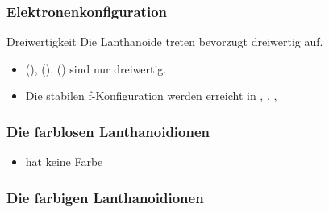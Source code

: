 \documentclass{beamer}
\begin{document}
\begin{frame}[t]\frametitle{Elektronenkonfiguration}

\begin{beamerboxesrounded}[shadow=true]{Dreiwertigkeit}
  Die Lanthanoide treten bevorzugt dreiwertig auf.
\end{beamerboxesrounded}
     \begin{table}
      \centering
{}
\end{table}

    \begin{itemize}
      \item {} (),  (),  () sind nur dreiwertig.
      \item Die stabilen f-Konfiguration werden erreicht in , , ,
    \end{itemize}
\end{frame}



  \begin{frame}[t]\frametitle{ Die farblosen Lanthanoidionen }
  \begin{beamerboxesrounded}[shadow=false]{}
  \begin{itemize}
  \item {} hat keine Farbe
  \end{itemize}
    \end{beamerboxesrounded}
  \end{frame}

 \begin{frame}[t]\frametitle{ Die farbigen Lanthanoidionen }
  \begin{beamerboxesrounded}[shadow=false]{}
  \end{beamerboxesrounded}
  \end{frame}
\end{document}
